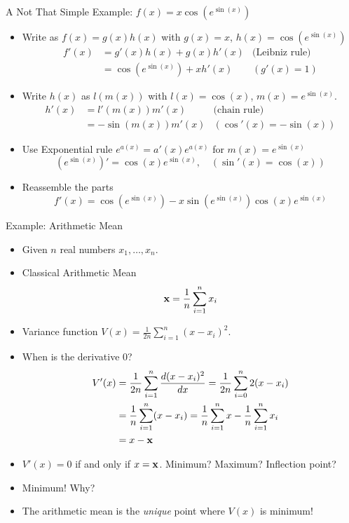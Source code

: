 \documentclass[8pt,dvipsnames]{beamer}
\begin{document}
\begin{frame}{A Not That Simple Example: $f(x) = x\cos(e^{\sin(x)})$}
  \begin{itemize}
    \item Write as $f(x) = g(x) h(x)$ with $g(x) = x$, $h(x) = \cos(e^{\sin(x)}) $
    \begin{align*}
      f'(x) &= g'(x)h(x) + g(x)h'(x)&\text{(Leibniz rule)}\\
            &= \cos(e^{\sin(x)}) + x h'(x)& (g'(x) = 1)
    \end{align*}
    \item Write $h(x)$ as $l(m(x))$ with $l(x) = \cos(x)$, $m(x) = e^{\sin(x)}$.
    \begin{align*}
      h'(x) &= l'(m(x)) m'(x) &\text{(chain rule)}\\ 
            &=-\sin(m(x)) m'(x) & (\cos'(x) = -\sin(x))
    \end{align*}
    \item Use Exponential rule $e^{a(x)} = a'(x)e^{a(x)}$ for $m(x) = e^{\sin(x)}$ 
    $$
      \left(e^{\sin(x)}\right)' = \cos(x)e^{\sin(x)},\quad (\sin'(x) = \cos(x)) 
    $$
    \item Reassemble the parts
    $$
      f'(x) = \cos(e^{\sin(x)})  -x\sin(e^{\sin(x)})\cos(x)e^{\sin(x)}
    $$
  \end{itemize}
\end{frame}

\begin{frame}{Example: Arithmetic Mean}
  \begin{itemize}[<+->]
    \item Given $n$ real numbers $x_1,\dots,x_n$.
    \item Classical Arithmetic Mean
    $$
    {\bf x} = \frac1n\sum_{i=1}^n x_i
    $$
  \item Variance function $V(x) = \frac1{2n}\sum_{i=1}^n (x-x_i)^2$. 
  \item When is the derivative 0?
  \begin{align*}
    V'(x) &= \frac1{2n}\sum_{i=1}^n \frac{d{(x-x_i)^2}}{d{x}} = \frac1{2n}\sum_{i=0}^n 2(x-x_i)\\
    & = \frac1n\sum_{i=1}^n (x-x_i) = \frac1n\sum_{i=1}^n x - \frac1n\sum_{i=1}^n x_i\\
    & = x -{\bf x}
  \end{align*}
    \item $V'(x) = 0$ if and only if $x={\bf x}$. Minimum? Maximum? Inflection point?
    \item Minimum! Why?
    \item The arithmetic mean is the \emph{unique} point where $V(x)$ is minimum!
  \end{itemize}
  
  
\end{frame}
\end{document}
